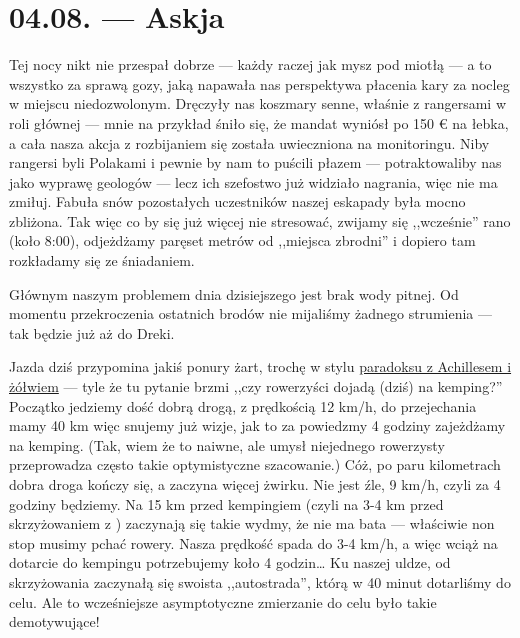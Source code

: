 \chapter*{04.08. --- Askja}

Tej nocy nikt nie przespał dobrze --- każdy raczej jak mysz pod miotłą --- a to wszystko za sprawą gozy, jaką napawała nas perspektywa płacenia kary za nocleg w miejscu niedozwolonym. Dręczyły nas koszmary senne, właśnie z rangersami w roli głównej --- mnie na przykład śniło się, że mandat wyniósł po 150 € na łebka, a cała nasza akcja z rozbijaniem się została uwieczniona na monitoringu. Niby rangersi byli Polakami i pewnie by nam to puścili płazem --- potraktowaliby nas jako wyprawę geologów --- lecz ich szefostwo już widziało nagrania, więc nie ma zmiłuj. Fabuła snów pozostałych uczestników naszej eskapady była mocno zbliżona. Tak więc co by się już więcej nie stresować, zwijamy się ,,wcześnie'' rano (koło 8:00), odjeżdżamy paręset metrów od ,,miejsca zbrodni'' i dopiero tam rozkładamy się ze śniadaniem.

Głównym naszym problemem dnia dzisiejszego jest brak wody pitnej. Od momentu przekroczenia ostatnich brodów nie mijaliśmy żadnego strumienia --- tak będzie już aż do Dreki.



Jazda dziś przypomina jakiś ponury żart, trochę w stylu \href{http://pl.wikipedia.org/wiki/Paradoksy_Zenona_z_Elei#Achilles_i_.C5.BC.C3.B3.C5.82w.5B2.5D}{paradoksu z Achillesem i żółwiem} --- tyle że tu pytanie brzmi ,,czy rowerzyści dojadą (dziś) na kemping?'' Początko jedziemy dość dobrą drogą, z prędkością 12 km/h, do przejechania mamy 40 km więc snujemy już wizje, jak to za powiedzmy 4 godziny zajeżdżamy na kemping. (Tak, wiem że to naiwne, ale umysł niejednego rowerzysty przeprowadza często takie optymistyczne szacowanie.) Cóż, po paru kilometrach dobra droga kończy się, a zaczyna więcej żwirku. Nie jest źle, 9 km/h, czyli za 4 godziny będziemy. Na 15 km przed kempingiem (czyli na 3-4 km przed skrzyżowaniem z ) zaczynają się takie wydmy, że nie ma bata --- właściwie non stop musimy pchać rowery. Nasza prędkość spada do 3-4 km/h, a więc wciąż na dotarcie do kempingu potrzebujemy koło 4 godzin… Ku naszej uldze, od skrzyżowania zaczynałą się swoista ,,autostrada'', którą w 40 minut dotarliśmy do celu. Ale to wcześniejsze asymptotyczne zmierzanie do celu było takie demotywujące!

